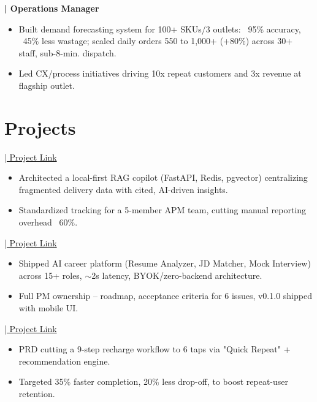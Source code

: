\documentclass[letterpaper]{deedy-resume} %
\newenvironment{tightitemizebold}{%
  \begin{itemize}\setlength{\itemsep}{0pt}\setlength{\parskip}{0pt}\setlength{\parsep}{0pt}\setlength{\topsep}{0pt}\bfseries
}{%
  \end{itemize}
}
\newcommand{\descriptbold}[1]{%
\color{subheadings}\raggedright\fontspec[Path = fonts/lato/]{Lato-Bol}\fontsize{11pt}{13pt}\selectfont\bfseries {#1 \\} \normalfont}
\begin{document}
\begin{minipage}[t]{0.63\textwidth}
\sectionspace 

 \descriptbold{| Operations Manager}
\begin{tightitemizebold}
\item Built demand forecasting system for 100+ SKUs/3 outlets: ~95\% accuracy, ~45\% less wastage; scaled daily orders 550 to 1,000+ (+80\%) across 30+ staff, sub-8-min. dispatch.
\item Led CX/process initiatives driving 10x repeat customers and 3x revenue at flagship outlet.
\end{tightitemizebold}

\sectionspace 


\section{Projects}

 \href{https://github.com/r4huldeveloper/Signalboard}{{\color{blue}| Project Link}}
\vspace*{0mm}
\begin{tightitemizebold}
\item Architected a local-first RAG copilot (FastAPI, Redis, pgvector) centralizing fragmented delivery data with cited, AI-driven insights.
\item Standardized tracking for a 5-member APM team, cutting manual reporting overhead ~60\%.
\end{tightitemizebold}
\sectionspace
{} \href{https://careercopilot.in}{{\color{blue}| Project Link}}
\vspace*{0mm}
\begin{tightitemizebold}
\item Shipped AI career platform (Resume Analyzer, JD Matcher, Mock Interview) across 15+ roles, $\sim$2s latency, BYOK/zero-backend architecture.
\item Full PM ownership -- roadmap, acceptance criteria for 6 issues, v0.1.0 shipped with mobile UI.
\end{tightitemizebold}

\sectionspace 

 \href{https://github.com/r4huldeveloper/Product-Case-PhonePe}{{\color{blue}| Project Link}}
\vspace*{0mm}
\begin{tightitemizebold}
\item PRD cutting a 9-step recharge workflow to 6 taps via "Quick Repeat" + recommendation engine.
\item Targeted 35\% faster completion, 20\% less drop-off, to boost repeat-user retention.
\end{tightitemizebold}

\end{minipage} %
\end{document}

